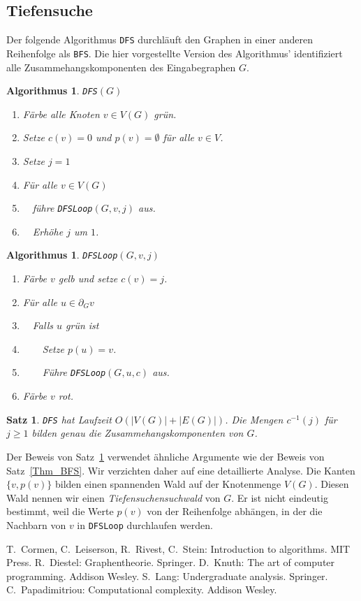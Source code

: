 \documentclass[10pt,reqno]{amsart}
\numberwithin{equation}{section}
\newtheorem{theorem}[definition]{Satz}
\newtheorem{algorithm}[definition]{Algorithmus}
\newcommand\Thm{Satz}
\begin{document}
\subsection{Tiefensuche}\label{sec_dfs}
Der folgende Algorithmus {\tt DFS} durchl\"auft den Graphen in einer anderen Reihenfolge als {\tt BFS}.
Die hier vorgestellte Version des Algorithmus' identifiziert alle Zusammehangskomponenten des Eingabegraphen $G$.

\begin{algorithm}{\tt DFS}$(G)$
	\begin{enumerate}
		\item F\"arbe alle Knoten $v\in V(G)$ gr\"un.
		\item Setze $c(v)=0$ und $p(v)=\emptyset$ f\"ur alle $v\in V$.
		\item Setze $j=1$
		\item F\"ur alle $v\in V(G)$
		\item $\quad$f\"uhre {\tt DFSLoop}$(G,v,j)$ aus.
		\item $\quad$Erh\"ohe $j$ um $1$.
	\end{enumerate}
\end{algorithm}

\begin{algorithm}{\tt DFSLoop}$(G,v,j)$
	\begin{enumerate}
		\item F\"arbe $v$ gelb und setze $c(v)=j$.
		\item F\"ur alle $u\in\partial_Gv$
		\item $\quad$Falls $u$ gr\"un ist
		\item $\quad\quad$Setze $p(u)=v$.
		\item $\quad\quad$F\"uhre {\tt DFSLoop}$(G,u,c)$ aus.
		\item F\"arbe $v$ rot.
	\end{enumerate}
\end{algorithm}

\begin{theorem}\label{thm_dfs}
	{\tt DFS} hat Laufzeit $O(|V(G)|+|E(G)|)$.
	Die Mengen $c^{-1}(j)$ f\"ur $j\geq1$ bilden genau die Zusammehangskomponenten von $G$.
\end{theorem}

Der Beweis von \Thm~\ref{thm_dfs} verwendet \"ahnliche Argumente wie der Beweis von \Thm~\ref{Thm_BFS}.
Wir verzichten daher auf eine detaillierte Analyse.
Die Kanten $\{v,p(v)\}$ bilden einen spannenden Wald auf der Knotenmenge $V(G)$.
Diesen Wald nennen wir einen {\em Tiefensuchensuchwald} von $G$.
Er ist nicht eindeutig bestimmt, weil die Werte $p(v)$ von der Reihenfolge abh\"angen, in der die Nachbarn von $v$ in {\tt DFSLoop} durchlaufen werden.

\begin{thebibliography}{99}
	T.~Cormen, C.~Leiserson, R.~Rivest, C.~Stein: Introduction to algorithms. MIT Press.
	R.~Diestel: Graphentheorie. Springer.
	D.~Knuth: The art of computer programming. Addison Wesley.
	S.~Lang: Undergraduate analysis. Springer.
	C.~Papadimitriou: Computational complexity. Addison Wesley.
\end{thebibliography}
\end{document}
